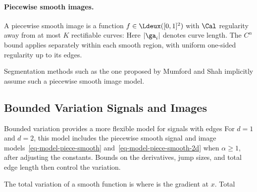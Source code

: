   
\paragraph{Piecewise smooth images.}

A piecewise smooth image is a function $f \in \Ldeux([0,1]^2)$ with $\Cal$ regularity away from at most $K$ rectifiable curves:
Here $|\ga_i|$ denotes curve length. The $C^\alpha$ bound applies separately within each smooth region, with uniform one-sided regularity up to its edges.

Segmentation methods such as the one proposed by Mumford and Shah \cite{mumford-shah} implicitly assume such a piecewise smooth image model.

                                           
\subsection{Bounded Variation Signals and Images}
\label{subsec-bv-model}

Bounded variation provides a more flexible model for signals with edges
For $d=1$ and $d=2$, this model includes the piecewise smooth signal and image models~\eqref{eq-model-piece-smooth} and~\eqref{eq-model-piece-smooth-2d} when $\alpha\geq1$, after adjusting the constants. Bounds on the derivatives, jump sizes, and total edge length then control the variation.

The total variation of a smooth function is 
where 
is the gradient at $x$. Total 